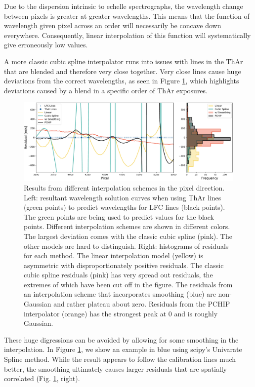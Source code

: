 \documentclass[12pt, letterpaper]{article}
\begin{document}
Due to the dispersion intrinsic to echelle spectrographs, the wavelength change between pixels is greater at greater wavelengths.  This means that the function of wavelength given pixel across an order will necessarily be concave down everywhere.  Consequently, linear interpolation of this function will systematically give erroneously low values.

A more classic cubic spline interpolator runs into issues with lines in the ThAr that are blended and therefore very close together.  Very close lines cause huge deviations from the correct wavelengths, as seen in Figure \ref{fig:xinterp}, which highlights deviations caused by a blend in a specific order of ThAr exposures.

\begin{figure}[h]
\centering
\includegraphics[width=\textwidth]{Figures/intpx_tests.pdf}
\caption{Results from different interpolation schemes in the pixel direction.
Left: resultant wavelength solution curves when using ThAr lines (green points) to predict wavelengths for LFC lines (black points).  The green points are being used to predict values for the black points.  Different interpolation schemes are shown in different colors.  The largest deviation comes with the classic cubic spline (pink).  The other models are hard to distinguish.
Right: histograms of residuals for each method.  The linear interpolation model (yellow) is asymmetric with disproportionately positive residuals.  The classic cubic spline residuals (pink) has very spread out residuals, the extremes of which have been cut off in the figure.  The residuals from an interpolation scheme that incorporates smoothing (blue) are non-Gaussian and rather plateau about zero.  Residuals from the PCHIP interpolator (orange) has the strongest peak at 0 and is roughly Gaussian.}
\label{fig:xinterp}
\end{figure} 

These huge digressions can be avoided by allowing for some smoothing in the interpolation.  In Figure \ref{fig:xinterp}, we show an example in blue using scipy's Univarate Spline method.  While the result appears to follow the calibration lines much better, the smoothing ultimately causes larger residuals that are spatially correlated (Fig. \ref{fig:xinterp}, right).
\end{document}
